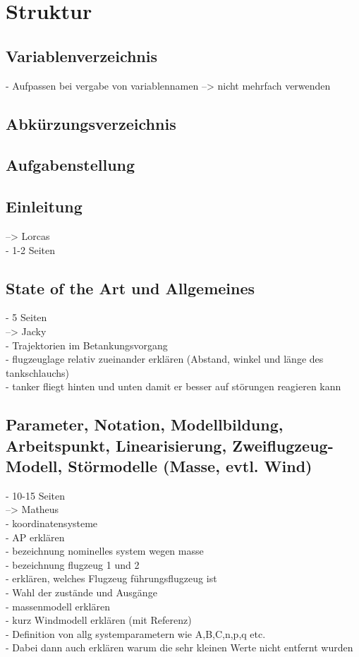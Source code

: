 \chapter{Struktur}\label{cha:struktur}
\section{Variablenverzeichnis}
- Aufpassen bei vergabe von variablennamen --> nicht mehrfach verwenden
\section{Abkürzungsverzeichnis}
\section{Aufgabenstellung}
\section{Einleitung} 
--> Lorcas\\
- 1-2 Seiten\\
\section{State of the Art und Allgemeines} 
- 5 Seiten\\
--> Jacky\\
- Trajektorien im Betankungsvorgang\\
- flugzeuglage relativ zueinander erklären (Abstand, winkel und länge des tankschlauchs)\\
- tanker fliegt hinten und unten damit er besser auf störungen reagieren kann\\
\section{Parameter, Notation, Modellbildung, Arbeitspunkt, Linearisierung, Zweiflugzeug-Modell, Störmodelle (Masse, evtl. Wind)}
- 10-15 Seiten\\
--> Matheus\\
- koordinatensysteme\\
- AP erklären\\
- bezeichnung nominelles system wegen masse\\
- bezeichnung flugzeug 1 und 2 \\
- erklären, welches Flugzeug führungsflugzeug ist\\
- Wahl der zustände und Ausgänge\\
- massenmodell erklären\\
- kurz Windmodell erklären (mit Referenz)\\
- Definition von allg systemparametern wie A,B,C,n,p,q etc.\\
- Dabei dann auch erklären warum die sehr kleinen Werte nicht entfernt wurden \\
